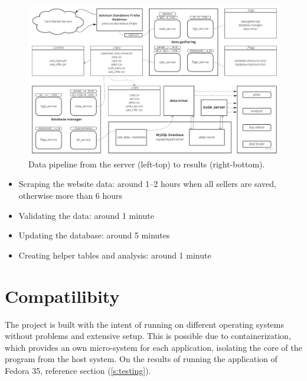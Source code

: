 \begin{figure}
\centering
\includegraphics[width=\textwidth]{figures/warehousing.jpg}
\caption{Data pipeline from the server (left-top) to results (right-bottom).}
\label{fig:pipeline}
\end{figure}

\begin{itemize}
    \item Scraping the website data: around 1--2 hours when all sellers are saved, otherwise more than 6 hours
    \item Validating the data: around 1 minute
    \item Updating the database: around 5 minutes
    \item Creating helper tables and analysis: around 1 minute
\end{itemize}


\section{Compatilibity}
The project is built with the intent of running on different operating systems without problems and extensive setup. This is possible due to containerization, which provides an own micro-system for each application, isolating the core of the program from the host system. On the results of running the application of Fedora 35, reference section (\ref{s:testing}).
